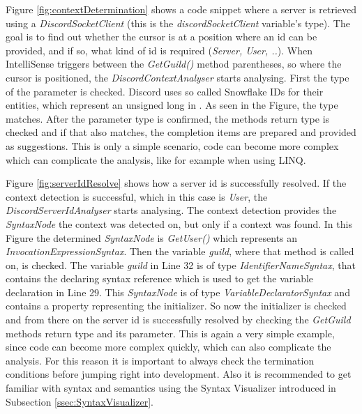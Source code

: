 \newpage
{}

Figure \ref{fig:contextDetermination} shows a code snippet where a server is retrieved using a \textit{DiscordSocketClient} (this is the \textit{discordSocketClient} variable's type). The goal is to find out whether the cursor is at a position where an id can be provided, and if so, what kind of id is required (\textit{Server, User, ..}). When IntelliSense triggers between the \textit{GetGuild()} method parentheses, so where the cursor is positioned, the \textit{DiscordContextAnalyser} starts analysing. First the type of the parameter is checked. Discord uses so called Snowflake IDs for their entities, which represent an unsigned long in \csharp. As seen in the Figure, the type matches. After the parameter type is confirmed, the methods return type is checked and if that also matches, the completion items are prepared and provided as suggestions. This is only a simple scenario, code can become more complex which can complicate the analysis, like for example when using LINQ.

\newpage
{}

Figure \ref{fig:serverIdResolve} shows how a server id is successfully resolved. If the context detection is successful, which in this case is \textit{User}, the \textit{DiscordServerIdAnalyser} starts analysing. The context detection provides the \textit{SyntaxNode} the context was detected on, but only if a context was found. In this Figure the determined \textit{SyntaxNode} is \textit{GetUser()} which represents an \textit{InvocationExpressionSyntax}. Then the variable \textit{guild}, where that method is called on, is checked. The variable \textit{guild} in Line 32 is of type \textit{IdentifierNameSyntax}, that contains the declaring syntax reference which is used to get the variable declaration in Line 29. This \textit{SyntaxNode} is of type \textit{VariableDeclaratorSyntax} and contains a property representing the initializer. So now the initializer is checked and from there on the server id is successfully resolved by checking the \textit{GetGuild} methods return type and its parameter. This is again a very simple example, since code can become more complex quickly, which can also complicate the analysis. For this reason it is important to always check the termination conditions before jumping right into development. Also it is recommended to get familiar with syntax and semantics using the Syntax Visualizer introduced in Subsection \ref{ssec:SyntaxVisualizer}.